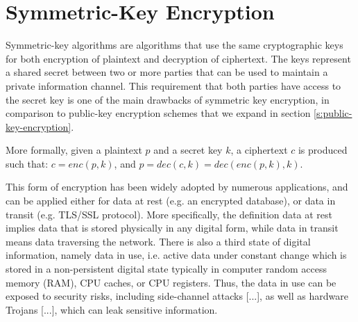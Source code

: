 \section{Symmetric-Key Encryption}\label{s:symmetric-key-encryption}
Symmetric-key algorithms are algorithms that use the same cryptographic keys for both encryption of plaintext and decryption of ciphertext.
The keys represent a shared secret between two or more parties that can be used to maintain a private information channel.
This requirement that both parties have access to the secret key is one of the main drawbacks of symmetric key encryption, in comparison to public-key encryption schemes that we expand in section \ref{s:public-key-encryption}.

More formally, given a plaintext $p$ and a secret key $k$, a ciphertext $c$ is produced such that:
$c = enc(p, k)$, and $p = dec(c, k) = dec(enc(p, k), k).$

This form of encryption has been widely adopted by numerous applications, and can be applied either for data at rest (e.g. an encrypted database), or data in transit (e.g. TLS/SSL protocol).
More specifically, the definition data at rest implies data that is stored physically in any digital form, while data in transit means data traversing the network.
There is also a third state of digital information, namely data in use, i.e. active data under constant change which is stored in a non-persistent digital state typically in computer random access memory (RAM), CPU caches, or CPU registers.
Thus, the data in use can be exposed to security risks, including side-channel attacks [...], as well as hardware Trojans [...], which can leak sensitive information.
